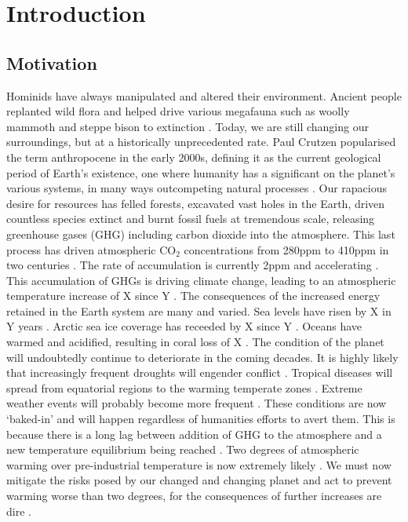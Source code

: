 
\chapter{Introduction} %

\ifpdf
    \graphicspath{{Chapter0/Figs/Raster/}{Chapter0/Figs/PDF/}{Chapter0/Figs/}}
\else
    \graphicspath{{Chapter0/Figs/Vector/}{Chapter0/Figs/}}
\fi

\section{Motivation}
Hominids have always manipulated and altered their environment. Ancient people replanted wild flora and helped drive various megafauna such as woolly mammoth and steppe bison to extinction \cite{Mann2015} \cite{Pushkina2008}. Today, we are still changing our surroundings, but at a historically unprecedented rate. Paul Crutzen popularised the term anthropocene in the early 2000s, defining it as the current geological period of Earth's existence, one where humanity has a significant on the planet's various systems, in many ways outcompeting natural processes \cite{Crutzen2006}. Our rapacious desire for resources has felled forests, excavated vast holes in the Earth, driven countless species extinct and burnt fossil fuels at tremendous scale, releasing greenhouse gases (GHG) including carbon dioxide into the atmosphere. This last process has driven atmospheric CO$_{2}$ concentrations from 280ppm to 410ppm in two centuries \cite{}. The rate of accumulation is currently 2ppm and accelerating \cite{}. This accumulation of GHGs is driving climate change, leading to an atmospheric temperature increase of X since Y \cite{}. The consequences of the increased energy retained in the Earth system are many and varied. Sea levels have risen by X in Y years \cite{}. Arctic sea ice coverage has receeded by X since Y \cite{}. Oceans have warmed and acidified, resulting in coral loss of X \cite{}. The condition of the planet will undoubtedly continue to deteriorate in the coming decades. It is highly likely that increasingly frequent droughts will engender conflict \cite{}. Tropical diseases will spread from equatorial regions to the warming temperate zones \cite{}. Extreme weather events will probably become more frequent \cite{}. These conditions are now `baked-in' and will happen regardless of humanities efforts to avert them. This is because there is a long lag between addition of GHG to the atmosphere and a new temperature equilibrium being reached \cite{}. Two degrees of atmospheric warming over pre-industrial temperature is now extremely likely \cite{}. We must now mitigate the risks posed by our changed and changing planet and act to prevent warming worse than two degrees, for the consequences of further increases are dire \cite{}.

